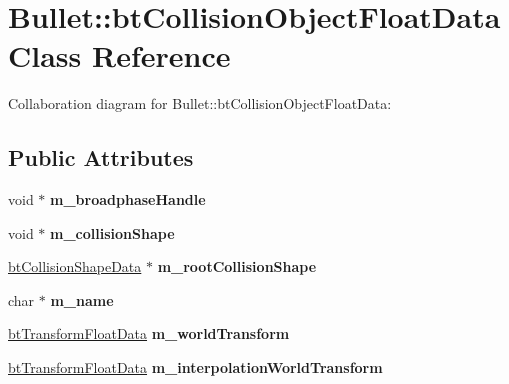 \hypertarget{class_bullet_1_1bt_collision_object_float_data}{\section{Bullet\+:\+:bt\+Collision\+Object\+Float\+Data Class Reference}
\label{class_bullet_1_1bt_collision_object_float_data}
}


Collaboration diagram for Bullet\+:\+:bt\+Collision\+Object\+Float\+Data\+:
\subsection*{Public Attributes}
\begin{DoxyCompactItemize}
\item 
\hypertarget{class_bullet_1_1bt_collision_object_float_data_a1a9577b466d1914abc813533ad3c646e}{void $\ast$ {\bfseries m\+\_\+broadphase\+Handle}}\label{class_bullet_1_1bt_collision_object_float_data_a1a9577b466d1914abc813533ad3c646e}

\item 
\hypertarget{class_bullet_1_1bt_collision_object_float_data_abee51b1d93f95e736934d84cb2bf7a93}{void $\ast$ {\bfseries m\+\_\+collision\+Shape}}\label{class_bullet_1_1bt_collision_object_float_data_abee51b1d93f95e736934d84cb2bf7a93}

\item 
\hypertarget{class_bullet_1_1bt_collision_object_float_data_aaefaf88e8646307e9fa74be740dba046}{\hyperlink{class_bullet_1_1bt_collision_shape_data}{bt\+Collision\+Shape\+Data} $\ast$ {\bfseries m\+\_\+root\+Collision\+Shape}}\label{class_bullet_1_1bt_collision_object_float_data_aaefaf88e8646307e9fa74be740dba046}

\item 
\hypertarget{class_bullet_1_1bt_collision_object_float_data_a26f909ffe876b1e63d29cfdb1600f196}{char $\ast$ {\bfseries m\+\_\+name}}\label{class_bullet_1_1bt_collision_object_float_data_a26f909ffe876b1e63d29cfdb1600f196}

\item 
\hypertarget{class_bullet_1_1bt_collision_object_float_data_adcecb57363c6956fd6378f8c2d77652d}{\hyperlink{class_bullet_1_1bt_transform_float_data}{bt\+Transform\+Float\+Data} {\bfseries m\+\_\+world\+Transform}}\label{class_bullet_1_1bt_collision_object_float_data_adcecb57363c6956fd6378f8c2d77652d}

\item 
\hypertarget{class_bullet_1_1bt_collision_object_float_data_a4c7ddb6126dfe7ccbab61c07640eed13}{\hyperlink{class_bullet_1_1bt_transform_float_data}{bt\+Transform\+Float\+Data} {\bfseries m\+\_\+interpolation\+World\+Transform}}\label{class_bullet_1_1bt_collision_object_float_data_a4c7ddb6126dfe7ccbab61c07640eed13}


\end{DoxyCompactItemize}
